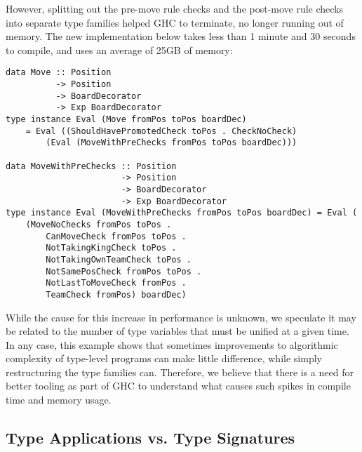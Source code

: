 However, splitting out the pre-move rule checks and the post-move rule checks into separate type families helped GHC to terminate, no longer running out of memory. The new implementation below takes less than 1 minute and 30 seconds to compile, and uses an average of 25GB of memory:
\begin{lstlisting}
data Move :: Position
          -> Position
          -> BoardDecorator
          -> Exp BoardDecorator
type instance Eval (Move fromPos toPos boardDec)
    = Eval ((ShouldHavePromotedCheck toPos . CheckNoCheck)
        (Eval (MoveWithPreChecks fromPos toPos boardDec)))

data MoveWithPreChecks :: Position
                       -> Position
                       -> BoardDecorator
                       -> Exp BoardDecorator
type instance Eval (MoveWithPreChecks fromPos toPos boardDec) = Eval (
    (MoveNoChecks fromPos toPos .
        CanMoveCheck fromPos toPos .
        NotTakingKingCheck toPos .
        NotTakingOwnTeamCheck toPos .
        NotSamePosCheck fromPos toPos .
        NotLastToMoveCheck fromPos .
        TeamCheck fromPos) boardDec)
\end{lstlisting}
While the cause for this increase in performance is unknown, we speculate it may be related to the number of type variables that must be unified at a given time. In any case, this example shows that sometimes improvements to algorithmic complexity of type-level programs can make little difference, while simply restructuring the type families can. Therefore, we believe that there is a need for better tooling as part of GHC to understand what causes such spikes in compile time and memory usage.

\subsection{Type Applications vs. Type Signatures}

